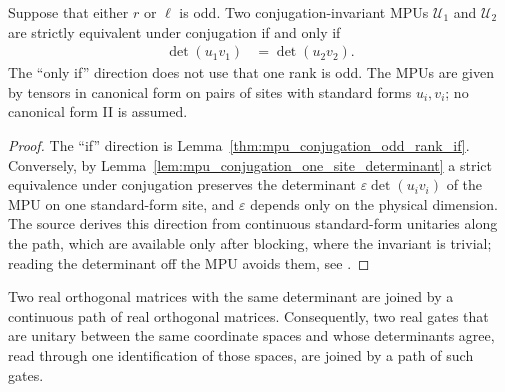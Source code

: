 \begin{theorem}
    \label{conjphs}
    \leanok
    Suppose that either $r$ or $\ell$ is odd. Two conjugation-invariant MPUs
    $\mathcal U_1$ and $\mathcal U_2$ are strictly equivalent under
    conjugation if and only if
    \begin{align}
        \det(u_1v_1) & =\det(u_2v_2).
    \end{align}
    The ``only if'' direction does not use that one rank is odd. The MPUs are
    given by tensors in canonical form on pairs of sites with standard forms
    $u_i,v_i$; no canonical form II is assumed.
\end{theorem}

\begin{proof}
    \leanok
    The ``if'' direction is Lemma~\ref{thm:mpu_conjugation_odd_rank_if}.
    Conversely, by Lemma~\ref{lem:mpu_conjugation_one_site_determinant} a
    strict equivalence under conjugation preserves the determinant
    $\varepsilon\det(u_iv_i)$ of the MPU on one standard-form site, and
    $\varepsilon$ depends only on the physical dimension. The source derives
    this direction from continuous standard-form unitaries along the path,
    which are available only after blocking, where the invariant is trivial;
    reading the determinant off the MPU avoids them, see
    \cite{gap:mpu_symmetry_path_criterion_blocking}.
\end{proof}

\begin{lemma}
    \label{lem:mpu_orthogonal_gate_interpolation}
    \leanok
    Two real orthogonal matrices with the same determinant are joined by a
    continuous path of real orthogonal matrices. Consequently, two real gates
    that are unitary between the same coordinate spaces and whose determinants
    agree, read through one identification of those spaces, are joined by a
    path of such gates.
\end{lemma}


